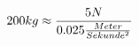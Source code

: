 \documentclass[preview]{standalone}
\begin{document}
\begin{align*}
{\special{dvisvgm:raw <g id='unique000'>}200kg \approx \frac{5N}{0.025 \frac{Meter}{Sekunde^{2}}}}\special{dvisvgm:raw </g>}
\end{align*}
\end{document}
